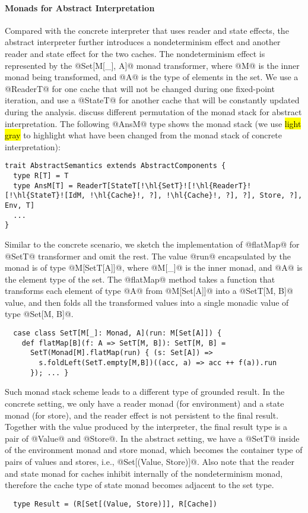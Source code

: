 \paragraph{Monads for Abstract Interpretation} Compared with the concrete
interpreter that uses reader and state effects, the abstract interpreter
further introduces a nondeterminism effect and another reader and state effect
for the two caches. The nondeterminism effect is represented by the
@Set[M[_], A]@ monad transformer, where @M@ is the inner monad being
transformed, and @A@ is the type of elements in the set. We use a @ReaderT@ for
one cache that will not be changed during one fixed-point iteration, and use a
@StateT@ for another cache that will be constantly updated during the analysis.
\citet{DBLP:journals/pacmpl/DaraisLNH17} discuss different permutation of the
monad stack for abstract interpretation. The following @AnsM@ type shows the
monad stack (we use \hl{light gray} to highlight what have been changed from
the monad stack of concrete interpretation):
\begin{lstlisting}[escapechar=!]
trait AbstractSemantics extends AbstractComponents {
  type R[T] = T
  type AnsM[T] = ReaderT[StateT[!\hl{SetT}![!\hl{ReaderT}![!\hl{StateT}![IdM, !\hl{Cache}!, ?], !\hl{Cache}!, ?], ?], Store, ?], Env, T]
  ...
}
\end{lstlisting}

Similar to the concrete scenario, we sketch the implementation of @flatMap@ for
@SetT@ transformer and omit the rest. The value @run@ encapsulated by the monad
is of type @M[SetT[A]]@, where @M[_]@ is the inner monad, and @A@ is the element
type of the set. The @flatMap@ method takes a function that transforms each
element of type @A@ from @M[Set[A]]@ into a @SetT[M, B]@ value, and then folds
all the transformed values into a single monadic value of type @Set[M, B]@.
\begin{lstlisting}
  case class SetT[M[_]: Monad, A](run: M[Set[A]]) {
    def flatMap[B](f: A => SetT[M, B]): SetT[M, B] =
      SetT(Monad[M].flatMap(run) { (s: Set[A]) =>
        s.foldLeft(SetT.empty[M,B])((acc, a) => acc ++ f(a)).run
      }); ... }
\end{lstlisting}

Such monad stack scheme leads to a different type of grounded result. In the concrete
setting, we only have a reader monad (for environment) and a state monad (for
store), and the reader effect is not persistent to the final result. Together
with the value produced by the interpreter, the final result type is a pair of
@Value@ and @Store@. In the abstract setting, we have a @SetT@ inside of the
environment monad and store monad, which becomes the container type of pairs
of values and stores, i.e., @Set[(Value, Store)]@. Also note that the reader and
state monad for caches inhibit internally of the nondeterminism monad, therefore
the cache type of state monad becomes adjacent to the set type.
\begin{lstlisting}
  type Result = (R[Set[(Value, Store)]], R[Cache])
\end{lstlisting}

